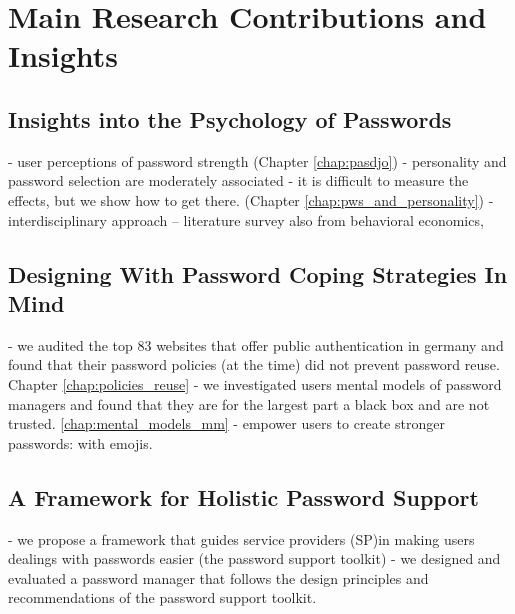 \section{Main Research Contributions and Insights}\label{sec:intro:contributions}

\subsection{Insights into the Psychology of Passwords}
- user perceptions of password strength (Chapter \ref{chap:pasdjo})
- personality and password selection are moderately associated
- it is difficult to measure the effects, but we show how to get there. (Chapter \ref{chap:pws_and_personality})
- interdisciplinary approach -- literature survey also from behavioral economics, 

\subsection{Designing With Password Coping Strategies In Mind}
- we audited the top 83 websites that offer public authentication in germany and found that their password policies (at the time) did not prevent password reuse. Chapter \ref{chap:policies_reuse}
- we investigated users mental models of password managers and found that they are for the largest part a black box and are not trusted. \ref{chap:mental_models_mm}
- empower users to create stronger passwords: with emojis. 


\subsection{A Framework for Holistic Password Support}
- we propose a framework that guides service providers (\gls{SP})in making users dealings with passwords easier (the password support toolkit)
- we designed and evaluated a password manager that follows the design principles and recommendations of the password support toolkit. 

